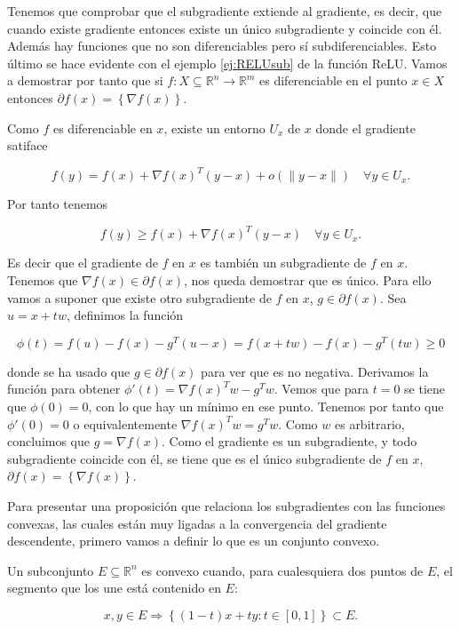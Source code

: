 Tenemos que comprobar que el subgradiente extiende al gradiente, es decir, que cuando existe gradiente entonces existe un único subgradiente y coincide con él. Además hay funciones que no son diferenciables pero sí subdiferenciables. Esto último se hace evidente con el ejemplo \ref{ej:RELUsub} de la función ReLU. Vamos a demostrar por tanto que si $f: X \subseteq \mathbb{R}^n \rightarrow \mathbb{R}^m$ es diferenciable en el punto $x\in X$ entonces  $\partial f(x)= \left \{ \nabla f(x) \right \}$.

Como $f$ es diferenciable en $x$, existe un entorno $U_x$ de $x$ donde el gradiente satiface 

$$  f(y) = f(x) + \nabla f(x)^T(y-x) + o(\|y-x \|) \quad \forall y \in U_x .$$

Por tanto tenemos

$$ f(y) \geq f(x) + \nabla f(x)^T(y-x) \quad \forall y \in U_x.$$

Es decir que el gradiente de $f$ en $x$ es también un subgradiente de $f$ en $x$. Tenemos que $\nabla f(x) \in \partial f(x)$, nos queda demostrar que es único. Para ello vamos a suponer que existe otro subgradiente de $f$ en $x$, $g \in \partial f(x)$. Sea $u=x+tw$, definimos la función

$$\phi(t)=f(u)-f(x)- g^T(u-x) = f(x+tw) -f(x) - g^T(tw) \geq 0$$

donde se ha usado que $g \in \partial f(x)$ para ver que es no negativa. Derivamos la función para obtener $\phi'(t) = \nabla f(x)^Tw - g^Tw$. Vemos que para $t=0$ se tiene que $\phi(0)=0$, con lo que hay un mínimo en ese punto. Tenemos por tanto que $\phi'(0)=0$ o equivalentemente $\nabla f(x)^Tw=g^Tw$. Como $w$ es arbitrario, concluimos que $g=\nabla f(x)$. Como el gradiente es un subgradiente, y todo subgradiente coincide con él, se tiene que es el único subgradiente de $f$ en $x$, $\partial f(x) = \left \{ \nabla f(x) \right \}$. 



Para presentar una proposición que relaciona los subgradientes con las funciones convexas, las cuales están muy ligadas a la convergencia del gradiente descendente, primero vamos a definir lo que es un conjunto convexo.


\begin{definicion}
    Un subconjunto $E \subseteq \mathbb{R}^n$ es convexo cuando, para cualesquiera dos puntos de $E$, el segmento que los une está contenido en $E$:

    $$x,y \in E \Rightarrow \left \{ (1-t)x + ty : t\in [0,1] \right \} \subset E.$$
\end{definicion}




